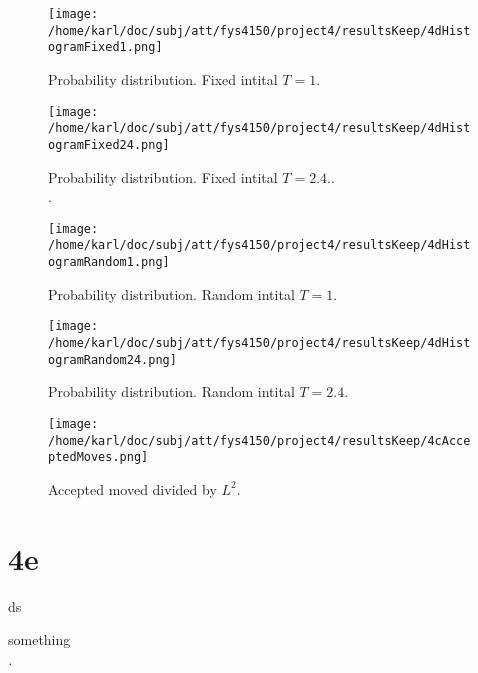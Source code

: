\documentclass{article}
\begin{document}
\begin{minipage}{.45\textwidth} 
	\begin{figure}[H]
		\centering
		\texttt{[image: /home/karl/doc/subj/att/fys4150/project4/resultsKeep/4dHistogramFixed1.png]}
		\caption{Probability distribution. Fixed intital $T = 1$. \\ \textit{}}
		\label{1}
	\end{figure}
\end{minipage}\hfill
\begin{minipage}{.45\textwidth} 
	\begin{figure}[H]
		\centering
		\texttt{[image: /home/karl/doc/subj/att/fys4150/project4/resultsKeep/4dHistogramFixed24.png]}
		\caption{Probability distribution. Fixed intital $T = 2.4$.. \\ \textit{}.}
		\label{1}
	\end{figure}
\end{minipage}\hfill
\vspace{2ex}

\begin{minipage}{.45\textwidth} 
	\begin{figure}[H]
		\centering
		\texttt{[image: /home/karl/doc/subj/att/fys4150/project4/resultsKeep/4dHistogramRandom1.png]}
		\caption{Probability distribution. Random intital $T = 1$. \\ \textit{}}
		\label{1}
	\end{figure}
\end{minipage}\hfill
\begin{minipage}{.45\textwidth} 
	\begin{figure}[H]
		\centering
		\texttt{[image: /home/karl/doc/subj/att/fys4150/project4/resultsKeep/4dHistogramRandom24.png]}
		\caption{Probability distribution. Random intital $T = 2.4$.  \\ \textit{}}
		\label{1}
	\end{figure}
\end{minipage}\hfill
\vspace{2ex}

\begin{figure}[H]
	\centering
	\texttt{[image: /home/karl/doc/subj/att/fys4150/project4/resultsKeep/4cAcceptedMoves.png]}
	\caption{Accepted moved divided by $L^2$. \\ \textit{}}
	\label{1}
\end{figure}

\section{4e}
ds

\begin{table}[H]
	\centering
	\begin{adjustbox}{width=.5\textwidth}
	\end{adjustbox}
	\caption{something \\ \textit{.}}
	\label{1}
\end{table}
\end{document}
